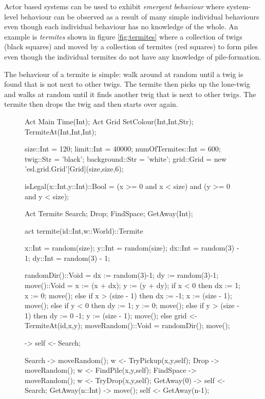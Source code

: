 \documentclass[5p,times]{elsarticle}
\begin{document}
Actor based systems can be used to exhibit {\it emergent behaviour} where system-level behaviour can be observed as a result of many simple individual behaviours even though each individual behaviour has no knowledge of the whole. An example is {\it termites} shown in figure \ref{fig:termites} where a collection of twigs (black squares) and moved by a collection of termites (red squares) to form piles even though the individual termites do not have any knowledge of pile-formation.

The behaviour of a termite is simple: walk around at random until a twig is found that is not next to other twigs. The termite then picks up the lone-twig and walks at random until it finds another twig that is next to other twigs. The termite then drops the twig and then starts over again.


\begin{figure}
\begin{multicols}{2}
\begin{ESL}
Act Main { Time(Int); }
Act Grid { SetColour(Int,Int,Str); TermiteAt(Int,Int,Int);}

size::Int          = 120;
limit::Int         = 40000;
numOfTermites::Int = 600;
twig::Str          = 'black';
background::Str    = 'white';
grid::Grid         = new 'esl.grid.Grid'[Grid](size,size,6); 

isLegal(x::Int,y::Int)::Bool = 
  (x >= 0 and x < size) and (y >= 0 and y < size);

Act Termite {  Search; Drop; FindSpace; GetAway(Int); }

act termite(id::Int,w::World)::Termite { 

  x::Int  = random(size);
  y::Int  = random(size);
  dx::Int = random(3) - 1;
  dy::Int = random(3) - 1;
  
  randomDir()::Void = {
    dx := random(3)-1;
    dy := random(3)-1;
  }
  move()::Void = {
    x := (x + dx); y := (y + dy);
    if x < 0 
    then { dx := 1; x := 0; move();
    } else if x > (size - 1)
    then { dx := -1; x := (size - 1); move();
    } else if y < 0 
    then { dy := 1; y := 0; move();
    } else if y > (size - 1)
    then { dy := 0 -1; y := (size - 1); move();
    } else grid <- TermiteAt(id,x,y);
  }
  moveRandom()::Void = {
    randomDir();
    move();
  }
  
  -> self <- Search;
  
  Search -> {
    moveRandom();
    w <- TryPickup(x,y,self);
  }
  Drop -> {
    moveRandom();
    w <- FindPile(x,y,self);
  }
  FindSpace -> {
    moveRandom();
    w <- TryDrop(x,y,self);
  }
  GetAway(0) -> {
    self <- Search;
  }
  GetAway(n::Int) -> {
    move();
    self <- GetAway(n-1);
  }
}



\end{ESL}
\end{multicols}
\end{figure}
\end{document}
